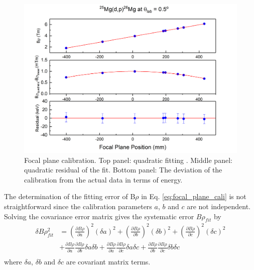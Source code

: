 \begin{figure}[tpb]
  \begin{center}
    \centerline{\includegraphics[scale=0.4]{graph/ch5/focalplane}}
    \caption{Focal plane calibration. Top panel: quadratic fitting . Middle panel: quadratic residual of the fit. Bottom panel: The deviation of the calibration from the actual data in terms of energy. }
    \label{fig:fp}
  \end{center}
\end{figure}

The determination of the fitting error of B$\rho$ in Eq. \ref{eq:focal_plane_cali} is  not straightforward since the calibration parameters  $a$, $b$ and $c$ are not  independent. Solving the covariance error matrix gives the systematic error $B\rho_{fit}$ by
\begin{equation}
    \label{eq:b-rho_fit}
    \begin{aligned}
    \delta B \rho^2_{fit} &=   (\frac{\partial B\rho}{\partial a})^2 (\delta a)^2 + (\frac{\partial B\rho}{\partial b})^2 (\delta b)^2 + (\frac{\partial B\rho}{\partial c})^2 (\delta c)^2 \\
                    & + \frac{\partial B\rho}{\partial a} \frac{\partial B\rho}{ \partial b} \delta a \delta b
                     + \frac{\partial B\rho}{\partial a} \frac{\partial B\rho}{ \partial c} \delta a \delta c
                     + \frac{\partial B\rho}{\partial b} \frac{\partial B\rho}{ \partial c} \delta b \delta c    \\
    \end{aligned}
\end{equation}
where $\delta a$, $\delta b$ and $\delta c$ are  covariant matrix terms.

